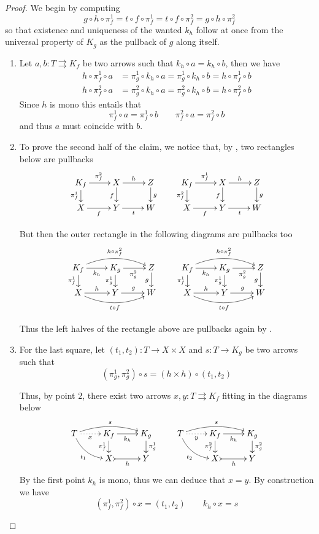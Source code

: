 \documentclass[3p]{elsarticle}
\theoremstyle{remark}
\theoremstyle{definition}
\begin{document}
\kpp*
\begin{proof}\label{kpp-proof}
	We begin by computing 
	\[g \circ h \circ \pi_f^1 =  t \circ f \circ \pi_f^1     =  t \circ f \circ \pi_f^2     =  g \circ h \circ \pi_f^2\]
	so that  existence  and uniqueness of the wanted $k_h$ follow at once from the universal property of $K_g$ as the pullback of $g$ along itself.
	
	
	\begin{enumerate}
		\item Let $a,b\colon T\rightrightarrows K_f$ be two arrows such that $k_h\circ a=k_h\circ b$, then we have
\begin{align*}h\circ \pi^1_f\circ a&=\pi^1_g\circ k_h\circ a=\pi^1_g\circ k_h\circ b=h\circ \pi^1_f\circ b\\
	h\circ \pi^2_f\circ a&=\pi^2_g\circ k_h\circ a=\pi^2_g\circ k_h\circ b=h\circ \pi^2_f\circ b
\end{align*}
Since $h$ is mono this entails that
\[	\pi^1_f\circ a=\pi^1_f\circ b \qquad \pi^2_f\circ a=\pi^2_f\circ b\]
and thus $a$ must coincide with $b$.
 
 		\item  
		To prove the second half of the claim, we notice that, by ,  two rectangles below are pullbacks
		\[\xymatrix@R=15pt{K_f \ar[r]^{\pi^2_f} \ar[d]_{\pi^1_f} & X \ar[r]^{h} \ar[d]_{f} & Z \ar[d]^{g} &  K_f \ar[r]^{\pi^1_f} \ar[d]_{\pi^2_f} & X \ar[r]^{h} \ar[d]_{f} & Z \ar[d]^{g}\\
			X \ar[r]_{f}& Y \ar[r]_{t} & W & X \ar[r]_{f} & Y  \ar[r]_{t}& W}\]
		
		But then the outer rectangle in the  following diagrams are pullbacks too
		\[\xymatrix@R=15pt{	K_f  \ar@/^.4cm/[rr]^{h\circ\pi^2_f}\ar[r]_{k_h} \ar[d]_{\pi^1_f}& K_g \ar[d]_{\pi^1_g}  \ar[r]_{\pi^2_g}& Z \ar[d]_{g} & K_f  \ar@/^.4cm/[rr]^{h\circ\pi^2_f}\ar[r]_{k_h} \ar[d]_{\pi^1_f}& K_g \ar[d]_{\pi^1_g}  \ar[r]_{\pi^2_g}& Z \ar[d]_{g} \\
			X \ar[r]^{h} \ar@/_.4cm/[rr]_{t\circ f}& Y \ar[r]^{g} & W & X \ar[r]^{h} \ar@/_.4cm/[rr]_{t\circ f}& Y \ar[r]^{g} & W}\]
		
		Thus the left halves of the rectangle above are pullbacks again by .   
	
		
		\item 		For the last square, let $(t_1, t_2)\colon T\to X\times X$ and $s\colon T\to K_g$ be two arrows such that
		\[(\pi^1_g, \pi^2_g)\circ s=(h\times h)\circ (t_1, t_2)\]
		
		Thus, by point $2$, there exist two arrows $x, y\colon T\rightrightarrows K_f$ fitting in the diagrams below
		\[\xymatrix@R=15pt{T\ar@{.>}[r]_-{x} \ar@/^.3cm/[rr]^{s} \ar@/_.3cm/[dr]_{t_1}& K_f \ar@{->}[r]_{k_h} \ar[d]_{\pi^1_f} & K_g \ar[d]^{\pi^1_g} & T \ar@{.>}[r]_-{y} \ar@/^.3cm/[rr]^{s} \ar@/_.3cm/[dr]_{t_2} & K_f  \ar@{->}[r]_{k_h} \ar[d]_{\pi^2_f}& K_g \ar[d]^{\pi^2_g}\\ & X \ar@{>->}[r]_{h} & Y &&X \ar@{>->}[r]_{h}& Y} \]
		By the first point $k_h$ is mono, thus we can deduce that $x=y$. By construction we have
		\[(\pi^1_f, \pi^2_f)\circ x=(t_1, t_2) \qquad k_h\circ x=s\] 
				

\end{enumerate}
\end{proof}
\end{document}
